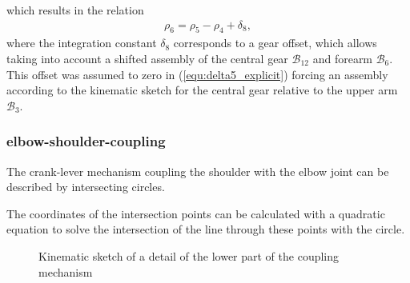 \documentclass[letterpaper, 10 pt, conference]{ieeeconf}  %
\newcommand{\body}[1]{\mathcal{B}_{#1}}
\begin{document}
%
which results in the relation
%
\begin{align}
\rho_6 = \rho_5 - \rho_4 + \delta_8,
\end{align}
%
where the integration constant $\delta_8$ corresponds to a gear offset, which allows taking into account a shifted assembly of the central gear $\body{12}$ and forearm $\body{6}$. This offset was assumed to zero in (\ref{equ:delta5_explicit}) forcing an assembly according to the kinematic sketch for the central gear relative to the upper arm $\body{3}$.


\subsubsection{elbow-shoulder-coupling}

The crank-lever mechanism coupling the shoulder with the elbow joint can be described by intersecting circles.

The coordinates of the intersection points can be calculated with a quadratic equation to solve the intersection of the line through these points with the circle.

\begin{figure}[htb]
    \small
    \begin{minipage}[t]{7.5cm}
        \vspace{0.2cm} %
        
    \end{minipage}
    
    \caption{Kinematic sketch of a detail of the lower part of the coupling mechanism}
    \label{fig:KAS5_lower_coupling}
\end{figure}
\end{document}
